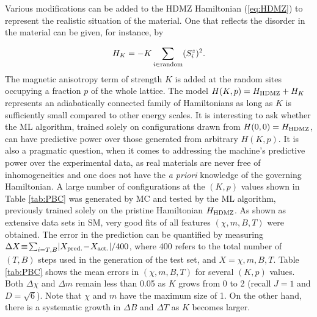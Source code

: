 \documentclass[reprint,amsmath,amssymb,aps,showpacs,superscriptaddress,prl]{revtex4-1}
\newcommand{\ba}{\begin{eqnarray}}
\newcommand{\ea}{\end{eqnarray}}
\begin{document}
Various modifications can be added to the HDMZ Hamiltonian (\ref{eq:HDMZ}) to represent the realistic situation of the material. One that reflects the disorder in the material can be given, for instance, by~\cite{skyrmion-book,jiang-review,fert-review}

\ba H_{K} = -K \sum_{i \in {\rm random}} (S^z_i )^2 . \ea
The magnetic anisotropy term of strength $K$ is added at the random sites occupying a fraction $p$ of the whole lattice. The model $H(K,p) = H_{\rm HDMZ} + H_K$ represents an adiabatically connected family of Hamiltonians as long as $K$ is sufficiently small compared to other energy scales. It is interesting to ask whether the ML algorithm, trained solely on  configurations drawn from $H(0,0)= H_{\rm HDMZ}$, can have predictive power over those generated from arbitrary $H(K,p)$. It is also a pragmatic question, when it comes to addressing the machine's predictive power over the experimental data, as real materials are never free of inhomogeneities and one does not have the {\it a priori} knowledge of the governing Hamiltonian. A large number of configurations at the $(K,p)$ values shown in Table \ref{tab:PBC} was generated by MC and tested by the ML algorithm, previously  trained solely on the pristine Hamiltonian $H_{\rm HDMZ}$. As shown as extensive data sets in SM, very good fits of all features $(\chi, m, B, T)$ were obtained. The error in the prediction can be quantified by measuring $\Delta X \! \equiv \!  \sum_{i=T,B} \! | X_{\rm pred.} \! - \! X_{\rm act.} | / 400 $, where 400 refers to the total number of $(T,B)$ steps used in the generation of the test set, and $X=\chi, m, B, T$. Table \ref{tab:PBC} shows the mean errors in $(\chi, m, B, T)$ for several $(K,p)$ values. Both $\Delta \chi$ and $\Delta m$ remain less than 0.05 as $K$ grows from 0 to 2 (recall $J=1$ and $D=\sqrt{6}$). Note that $\chi$ and $m$ have the maximum size of 1. On the other hand, there is a systematic growth in $\Delta B$ and $\Delta T$ as $K$ becomes larger.
\end{document}
